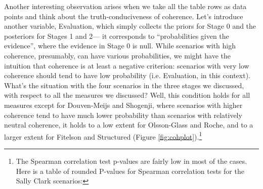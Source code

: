 \documentclass[10pt,]{scrartcl}
\begin{document}
Another interesting observation arises when we take all the table rows as data points and think about the truth-conduciveness of coherence.  Let's introduce another variable, \textsf{Evaluation}, which simply collects the priors for Stage 0 and the posteriors for Stages 1 and 2--- it corresponds to ``probabilities given the evidence'', where the evidence in Stage 0 is null. While scenarios with high coherence, presumably, can have various probabilities, we might have the intuition that coherence is at least a negative criterion: scenarios with very low coherence should tend to have low probability (i.e. \textsf{Evaluation}, in this context). What's the situation with the four scenarios in the three stages we discussed, with respect to all the measures we discussed? Well, this condition holds for all measures except for Douven-Meijs and Shogenji, where scenarios with higher coherence tend to have much lower probability than scenarios with relatively neutral coherence, it holds to a low extent for Olsson-Glass and Roche, and to a larger extent for Fitelson and Structured  (Figure \ref{fig:cohplot}).\footnote{The Spearman correlation test p-values are fairly low in most of the cases. Here is a table of rounded P-values for Spearman correlation tests for the Sally Clark scenarios:

}
\end{document}
